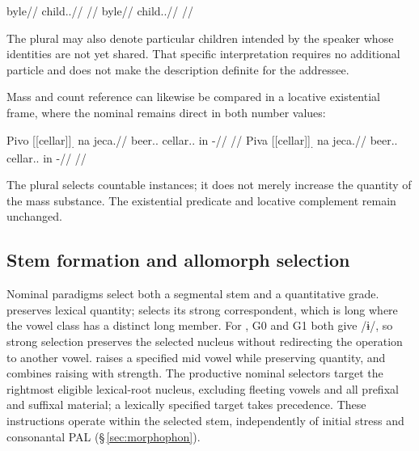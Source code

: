 \pex
\a
\begingl
\gla byle//
\glb child.\Dir{}.\Pl{}//
\glft {} //
\endgl
\a
\begingl
\gla byle//
\glb child.\Dir{}.\Pl{}//
\glft {} //
\endgl
\xe

The plural may also denote particular children intended by the speaker whose
identities are not yet shared. That specific interpretation requires no
additional particle and does not make the description definite for the addressee.

Mass and count reference can likewise be compared in a locative existential
frame, where the nominal remains direct in both number values:

\pex\label{ex:nm-slot-mass-count}
\a
\begingl
\gla Pivo \textnormal{[[cellar]]}\textsubscript{\Ind{}.\Sg{}} na jeca.//
\glb beer.\Dir{}.\Sg{} cellar.\Ind{}.\Sg{} in \Exst{}-\Cont{}//
\glft {} //
\endgl
\a
\begingl
\gla Piva \textnormal{[[cellar]]}\textsubscript{\Ind{}.\Sg{}} na jeca.//
\glb beer.\Dir{}.\Pl{} cellar.\Ind{}.\Sg{} in \Exst{}-\Cont{}//
\glft {} //
\endgl
\xe

The plural selects countable instances; it does not merely increase the
quantity of the mass substance. The existential predicate and locative
complement remain unchanged.

\subsection{Stem formation and allomorph selection}
\label{sec:nm-stemform}
\label{sec:nm-stem-grades}

Nominal paradigms select both a segmental stem and a quantitative grade.
 preserves lexical quantity;  selects its strong
correspondent, which is long where the vowel class has a distinct long member.
For , G0 and G1 both give /ɨ/, so strong selection preserves the
selected nucleus without redirecting the operation to another vowel.
 raises a specified mid vowel while preserving quantity, and  combines raising with
strength. The productive nominal selectors target the rightmost eligible
lexical-root nucleus, excluding fleeting vowels and all prefixal and suffixal
material; a lexically specified target takes precedence. These instructions
operate within the selected stem, independently of initial stress and
consonantal PAL (§\,\ref{sec:morphophon}).

